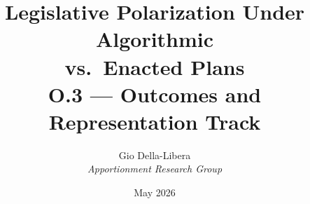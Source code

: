 \documentclass[12pt]{article}
\title{\textbf{Legislative Polarization Under Algorithmic\\
vs.\ Enacted Plans}\\[0.4em]
\large O.3 --- Outcomes and Representation Track}
\author{Gio Della-Libera \\ \textit{Apportionment Research Group}}
\date{May 2026}
\begin{document}
\maketitle
\begin{abstract}\end{abstract}






\end{document}

